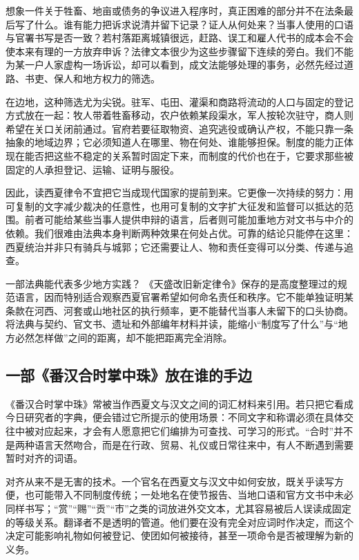 想象一件关于牲畜、地亩或债务的争议进入程序时，真正困难的部分并不在法条最后写了什么。谁有能力把诉求说清并留下记录？证人从何处来？当事人使用的口语与官署书写是否一致？若村落距离城镇很远，赶路、误工和雇人代书的成本会不会使本来有理的一方放弃申诉？法律文本很少为这些步骤留下连续的旁白。我们不能为某一户人家虚构一场诉讼，却可以看到，成文法能够处理的事务，必然先经过道路、书吏、保人和地方权力的筛选。

在边地，这种筛选尤为尖锐。驻军、屯田、灌渠和商路将流动的人口与固定的登记方式放在一起：牧人带着牲畜移动，农户依赖某段渠水，军人按轮次驻守，商人则希望在关口关闭前通过。官府若要征取物资、追究逃役或确认产权，不能只靠一条抽象的地域边界；它必须知道人在哪里、物在何处、谁能够担保。制度的能力正体现在能否把这些不稳定的关系暂时固定下来，而制度的代价也在于，它要求那些被固定的人承担登记、运输、证明与服役。

因此，读西夏律令不宜把它当成现代国家的提前到来。它更像一次持续的努力：用可复制的文字减少裁决的任意性，也用可复制的文字扩大征发和监督可以抵达的范围。前者可能给某些当事人提供申辩的语言，后者则可能加重地方对文书与中介的依赖。我们很难由法典本身判断两种效果在何处占优。可靠的结论只能停在这里：西夏统治并非只有骑兵与城郭；它还需要让人、物和责任变得可以分类、传递与追查。

\begin{debate}{一部法典能代表多少地方实践？}
《天盛改旧新定律令》保存的是高度整理过的规范语言，因而特别适合观察西夏官署希望如何命名责任和秩序。它不能单独证明某条款在河西、河套或山地社区的执行频率，更不能替代当事人未留下的口头协商。将法典与契约、官文书、遗址和外部编年材料并读，能缩小“制度写了什么”与“地方必然怎样做”之间的距离，却不能把距离完全消除。
\end{debate}

\subsection{一部《番汉合时掌中珠》放在谁的手边}

《番汉合时掌中珠》常被当作西夏文与汉文之间的词汇材料来引用。若只把它看成今日研究者的字典，便会错过它所提示的使用场景：不同文字和称谓必须在具体交往中被对应起来，才会有人愿意把它们编排为可查找、可学习的形式。“合时”并不是两种语言天然吻合，而是在行政、贸易、礼仪或日常往来中，有人不断遇到需要暂时对齐的词语。

对齐从来不是无害的技术。一个官名在西夏文与汉文中如何安放，既关乎读写方便，也可能带入不同制度传统；一处地名在使节报告、当地口语和官方文书中未必同样书写；“赏”“赐”“贡”“市”之类的词放进外交文本，尤其容易被后人误读成固定的等级关系。翻译者不是透明的管道。他们要在没有完全对应词时作决定，而这个决定可能影响礼物如何被登记、使团如何被接待，甚至一项命令是否被理解为新的义务。

